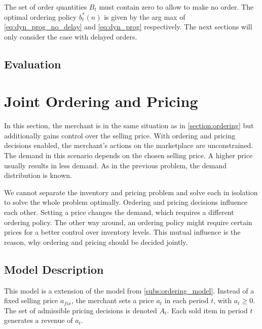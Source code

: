 The set of order quantities $B_t$ must contain zero to allow to make no order.
The optimal ordering policy $b_t^*(n)$ is given by the arg max of \cref{eq:dyn_prog_no_delay} and \cref{eq:dyn_prog} respectively.
The next sections will only consider the case with delayed orders.

\subsection{Evaluation}


\section{Joint Ordering and Pricing}
In this section, the merchant is in the same situation as in \cref{section:ordering} but additionally gains control over the selling price.
With ordering and pricing decisions enabled, the merchant's actions on the marketplace are unconstrained.
The demand in this scenario depends on the chosen selling price.
A higher price usually results in less demand.
As in the previous problem, the demand distribution is known.

We cannot separate the inventory and pricing problem and solve each in isolation to solve the whole problem optimally.
Ordering and pricing decisions influence each other.
Setting a price changes the demand, which requires a different ordering policy.
The other way around, an ordering policy might require certain prices for a better control over inventory levels.
This mutual influence is the reason, why ordering and pricing should be decided jointly.

\subsection{Model Description}
This model is a extension of the model from \cref{subs:ordering_model}.
Instead of a fixed selling price $a_{fix}$, the merchant sets a price $a_t$ in each period $t$, with $a_t \geq 0$.
The set of admissible pricing decisions is denoted $A_t$.
Each sold item in period $t$ generates a revenue of $a_t$.

